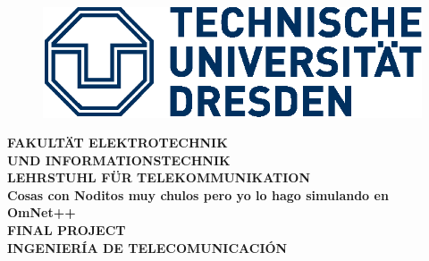 \thispagestyle{empty}

\begin{center}
  \begin{figure}[ht]
    \begin{center}
      \includegraphics[scale=1]{logo_tud.eps}
    \end{center}
  \end{figure}
  \vspace{0.2cm}
  \Large{\textbf{FAKULT\"AT ELEKTROTECHNIK\\ UND INFORMATIONSTECHNIK}}\\
  \vspace{0.5cm}
  \Large{\textbf{LEHRSTUHL F\"UR TELEKOMMUNIKATION}}\\
  \vspace{5cm}
  \Huge{\textbf{Cosas con Noditos muy chulos pero yo lo hago simulando en OmNet++}}\\
  \vspace{3cm}
  \Large{\textbf{FINAL PROJECT}}\\
  \vspace{0.5cm}
  \large{\textbf{INGENIER\'IA DE TELECOMUNICACI\'ON}}\\
\end{center}

\vspace{4cm}
\centerline{ }
\vspace{0.2cm}
\centerline{ }
